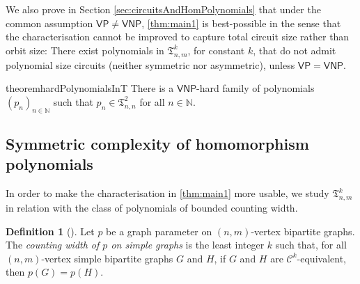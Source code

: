 \documentclass[11pt, DIV=15]{scrarticle}
\theoremstyle{definition}
\newtheorem{definition}{Definition}[section]
\theoremstyle{plain}
\theoremstyle{remark}
\newcommand{\bbN}{\mathbb{N}}
\newcommand{\VP}{\mathsf{VP}}
\newcommand{\VNP}{\mathsf{VNP}}
\begin{document}
We also prove in Section \ref{sec:circuitsAndHomPolynomials} that under the common assumption $\VP \neq \VNP$,
\cref{thm:main1} is best-possible in the sense that the
characterisation cannot be improved to capture total circuit size
rather than orbit size: There exist polynomials in
$\mathfrak{T}_{n,m}^k$, for constant $k$, that do not admit polynomial
size circuits (neither symmetric nor asymmetric), unless $\VP =
\VNP$. 
\begin{restatable}{theorem}{hardPolynomialsInT}\label{thm:hardPolynomialsInT}
	There is a $\VNP$-hard family of polynomials $(p_{n})_{n \in \bbN}$ such that $p_{n} \in \mathfrak{T}_{n,n}^2$ for all $n \in \mathbb{N}$.
\end{restatable}	

\subsection{Symmetric complexity of homomorphism polynomials}

In order to make the characterisation in \cref{thm:main1} more usable, we study $\mathfrak{T}^k_{n,m}$ in relation with the class of polynomials of bounded counting width.

\begin{definition}[\cite{anderson_symmetric_2017}]
	Let $p$ be a graph parameter on $(n,m)$-vertex bipartite graphs.
	The \emph{counting width of $p$ on simple graphs} is the least integer $k$ such that, for all $(n,m)$-vertex simple bipartite graphs $G$ and $H$, if $G$ and $H$ are $\mathcal{C}^k$-equivalent, then $p(G) = p(H)$.
\end{definition}

%
%
\end{document}
